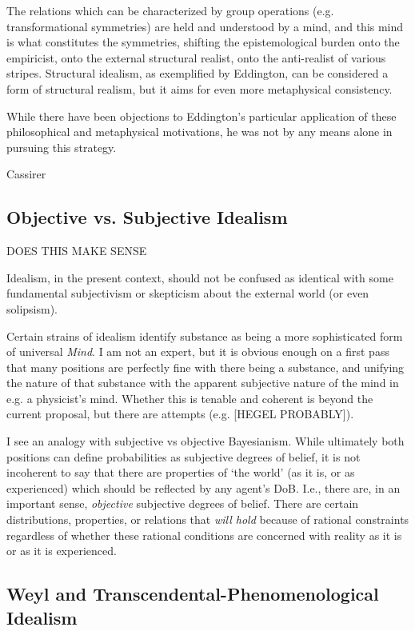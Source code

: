 The relations which can be characterized by group operations (e.g. transformational symmetries) are held and understood by a mind, and this mind is what constitutes the symmetries, shifting the epistemological burden onto the empiricist, onto the external structural realist, onto the anti-realist of various stripes.  Structural idealism, as exemplified by Eddington, can be considered a form of structural realism, but it aims for even more metaphysical consistency.  

While there have been objections to Eddington's particular application of these philosophical and metaphysical motivations, he was not by any means alone in pursuing this strategy.  



Cassirer

\subsection{Objective vs. Subjective Idealism}

DOES THIS MAKE SENSE

Idealism, in the present context, should not be confused as identical with some fundamental subjectivism or skepticism about the external world (or even solipsism).

Certain strains of idealism identify substance as being a more sophisticated form of universal \emph{Mind}.  I am not an expert, but it is obvious enough on a first pass that many positions are perfectly fine with there being a substance, and unifying the nature of that substance with the apparent subjective nature of the mind in e.g. a physicist's mind.  Whether this is tenable and coherent is beyond the current proposal, but there are attempts (e.g. [HEGEL PROBABLY]).

I see an analogy with subjective vs objective Bayesianism.  While ultimately both positions can define probabilities as subjective degrees of belief, it is not incoherent to say that there are properties of `the world' (as it is, or as experienced) which should be reflected by any agent's DoB.  I.e., there are, in an important sense, \emph{objective} subjective degrees of belief.  There are certain distributions, properties, or relations that \emph{will hold} because of rational constraints regardless of whether these rational conditions are concerned with reality as it is or as it is experienced.



\subsection{Weyl and Transcendental-Phenomenological Idealism}

